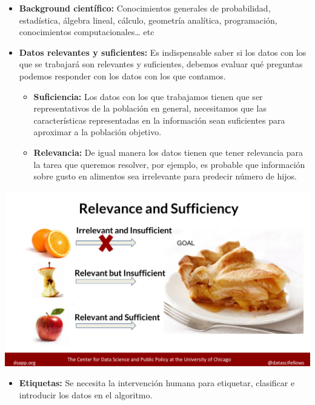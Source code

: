 \documentclass[
]{book}
\providecommand{\tightlist}{%
  \setlength{\itemsep}{0pt}\setlength{\parskip}{0pt}}
\begin{document}
\begin{itemize}
\item
  \textbf{Background científico:} Conocimientos generales de probabilidad, estadística, álgebra lineal, cálculo, geometría analítica, programación, conocimientos computacionales\ldots{} etc
\item
  \textbf{Datos relevantes y suficientes:} Es indispensable saber si los datos con los que se trabajará son relevantes y suficientes, debemos evaluar qué preguntas podemos responder con los datos con los que contamos.

  \begin{itemize}
  \item
    \textbf{Suficiencia:} Los datos con los que trabajamos tienen que ser representativos de la población en general, necesitamos que las características representadas en la información sean suficientes para aproximar a la población objetivo.
  \item
    \textbf{Relevancia:} De igual manera los datos tienen que tener relevancia para la tarea que queremos resolver, por ejemplo, es probable que información sobre gusto en alimentos sea irrelevante para predecir número de hijos.
  \end{itemize}
\end{itemize}

\begin{center}\includegraphics{img/01-intro2ds/11_relevancia_suficiencia} \end{center}

\begin{itemize}
\tightlist
\item
  \textbf{Etiquetas:} Se necesita la intervención humana para etiquetar, clasificar e introducir los datos en el algoritmo.
\end{itemize}
\end{document}
